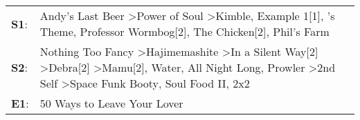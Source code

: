 \begin{supertabular}{p{0.03\textwidth}p{0.92\textwidth}}
 \textbf{S1}:  &                                                                                                                                                                                                Andy's Last Beer\textsuperscript{} \textgreater \enspace Power of Soul\textsuperscript{} \textgreater \enspace Kimble\textsuperscript{}, \enspace Example 1[1]\textsuperscript{}, 's Theme\textsuperscript{}, \enspace Professor Wormbog[2]\textsuperscript{}, \enspace The Chicken[2]\textsuperscript{}, \enspace Phil's Farm\textsuperscript{}  \enspace  \\
 \textbf{S2}:  &  Nothing Too Fancy\textsuperscript{} \textgreater \enspace Hajimemashite\textsuperscript{} \textgreater \enspace In a Silent Way[2]\textsuperscript{} \textgreater \enspace Debra[2]\textsuperscript{} \textgreater \enspace Mamu[2]\textsuperscript{}, \enspace Water\textsuperscript{}, \enspace All Night Long\textsuperscript{}, \enspace Prowler\textsuperscript{} \textgreater \enspace 2nd Self\textsuperscript{} \textgreater \enspace Space Funk Booty\textsuperscript{}, \enspace Soul Food II\textsuperscript{}, \enspace 2x2\textsuperscript{}  \enspace  \\
 \textbf{E1}:  &                                                                                                                                                                                                                                                                                                                                                                                                                                                                                                              50 Ways to Leave Your Lover\textsuperscript{}  \enspace  \\
\end{supertabular}
